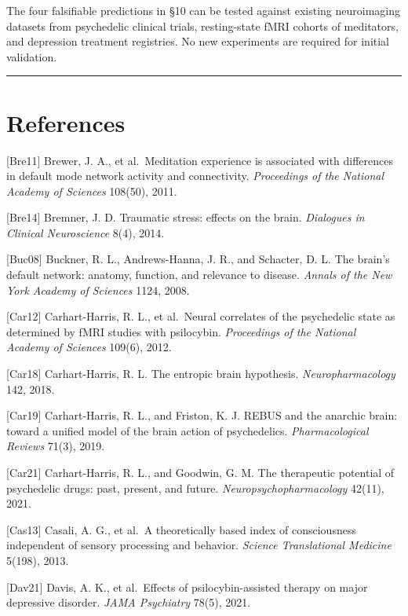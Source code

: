 \documentclass[12pt]{article}
\begin{document}
The four falsifiable predictions in §10 can be tested against existing
neuroimaging datasets from psychedelic clinical trials, resting-state
fMRI cohorts of meditators, and depression treatment registries. No new
experiments are required for initial validation.

\begin{center}\rule{0.5\linewidth}{0.5pt}\end{center}

\section{References}\label{references}

{[}Bre11{]} Brewer, J. A., et al.~Meditation experience is associated
with differences in default mode network activity and connectivity.
\emph{Proceedings of the National Academy of Sciences} 108(50), 2011.

{[}Bre14{]} Bremner, J. D. Traumatic stress: effects on the brain.
\emph{Dialogues in Clinical Neuroscience} 8(4), 2014.

{[}Buc08{]} Buckner, R. L., Andrews-Hanna, J. R., and Schacter, D. L.
The brain's default network: anatomy, function, and relevance to
disease. \emph{Annals of the New York Academy of Sciences} 1124, 2008.

{[}Car12{]} Carhart-Harris, R. L., et al.~Neural correlates of the
psychedelic state as determined by fMRI studies with psilocybin.
\emph{Proceedings of the National Academy of Sciences} 109(6), 2012.

{[}Car18{]} Carhart-Harris, R. L. The entropic brain hypothesis.
\emph{Neuropharmacology} 142, 2018.

{[}Car19{]} Carhart-Harris, R. L., and Friston, K. J. REBUS and the
anarchic brain: toward a unified model of the brain action of
psychedelics. \emph{Pharmacological Reviews} 71(3), 2019.

{[}Car21{]} Carhart-Harris, R. L., and Goodwin, G. M. The therapeutic
potential of psychedelic drugs: past, present, and future.
\emph{Neuropsychopharmacology} 42(11), 2021.

{[}Cas13{]} Casali, A. G., et al.~A theoretically based index of
consciousness independent of sensory processing and behavior.
\emph{Science Translational Medicine} 5(198), 2013.

{[}Dav21{]} Davis, A. K., et al.~Effects of psilocybin-assisted therapy
on major depressive disorder. \emph{JAMA Psychiatry} 78(5), 2021.
\end{document}
